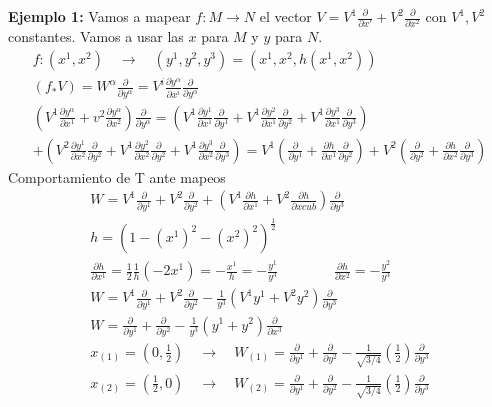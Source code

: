 \documentclass{article}
\begin{document}
\textbf{Ejemplo 1: } Vamos a mapear $ f: M \rightarrow N  $ el vector $ V = V^1  \frac{\partial  }{\partial x' } + V ^2 \frac{\partial  }{\partial x ^2} $ con $ V^1,V^2  $ constantes. Vamos a usar las $ x  $ para $ M  $ y $ y  $ para $  N  $.
\begin{gather*}
  f: ( x ^ {1 } , x ^ {2 }) \quad \rightarrow \quad (y ^ {1 }, y ^ {2 }, y ^ {3 }) = (x ^ {1 }, x ^ { 2 }, h(x ^ {1 }, x ^ {2 }))\\
  (f_* V ) = W ^ {\alpha } \frac{\partial  }{\partial y ^ {\alpha }} = V ^ {i } \frac{\partial y ^ {\alpha} }{\partial x ^ {i }}\frac{\partial  }{\partial y ^ {\alpha }}\\
  \left(V ^ {1 } \frac{\partial y ^ {\alpha } }{\partial x ^ {1 }} + v ^ {2 } \frac{\partial y ^ {\alpha } }{\partial x ^ {2 }}\right) \frac{\partial  }{\partial y ^ { \alpha }} = \left(V ^ {1 } \frac{\partial y ^ {1 }}{\partial x ^ {1 } }\frac{\partial  }{\partial y ^ {1 }} + V ^ { 1 } \frac{\partial y ^ {2 } }{\partial  x ^ {1 }} \frac{\partial  }{\partial y ^2} + V ^ {1 } \frac{\partial y ^ {3 } }{\partial x ^ {1 } }\frac{\partial  }{\partial y ^ {3 }}\right) \\
  + \left(V ^ {2 } \frac{\partial y ^ {1 }}{\partial x ^ {2 } }\frac{\partial  }{\partial y ^ {2 }} + V ^ { 1 } \frac{\partial y ^ {2 } }{\partial  x ^ {2 }} \frac{\partial  }{\partial y ^2} + V ^ {1 } \frac{\partial y ^ {3 } }{\partial x ^ {2 } }\frac{\partial  }{\partial y ^ {3 }}\right) = V ^ {1 } ( \frac{\partial  }{\partial y ^ {1 }} + \frac{\partial h  }{\partial x^1}\frac{\partial  }{\partial y ^2}) + V ^ {2 } ( \frac{\partial  }{\partial y ^ {2 }} + \frac{\partial h  }{\partial x^2}\frac{\partial  }{\partial y ^3}) 
\end{gather*}
Comportamiento de T ante mapeos 
\begin{gather*}
  W = V^1 \frac{\partial  }{\partial y ^ {1 }} + V^2 \frac{\partial  }{\partial y ^2 } + \left(V ^ {1 } \frac{\partial h  }{\partial x ^ {1 }} + V ^2 \frac{\partial h  }{\partial x cub}\right) \frac{\partial  }{\partial y ^ {3 }}\\
  h = (1 - (x ^1)^2 - (x ^2)^2)^ {\frac{1}{2}}\\
  \frac{\partial h  }{\partial x ^1 } = \frac{1}{2} \frac{1}{h}(-2x^1) = - \frac{x^1 }{h } = - \frac{y^1 }{y^3 } \qquad \qquad \frac{\partial h  }{\partial x ^2} = - \frac{y ^2}{y ^ {3 }}\\
  W = V^1 \frac{\partial  }{\partial y^1 } + V^2 \frac{\partial  }{\partial y ^2} - \frac{1}{y ^3 } \left(V^1 y^1 + V^2 y^2 \right)\frac{\partial  }{\partial y ^3 }\\
  W = \frac{\partial  }{\partial y ^1 } + \frac{\partial  }{\partial y ^2 } - \frac{1}{y^3 } (y^1 + y^2) \frac{\partial  }{\partial x^3 }\\
  x _{(1)}  = (0,\frac{1}{2}) \quad \rightarrow \quad W _{(1) } = \frac{\partial  }{\partial y ^ {1 }} + \frac{\partial  }{\partial y ^ {2 }} - \frac{1}{\sqrt{3/4 } }\left(\frac{1}{2}\right)\frac{\partial  }{\partial y ^ {3 }}\\
  x _{(2) } = (\frac{1}{2}, 0 ) \quad \rightarrow \quad W _{(2) } = \frac{\partial  }{\partial y ^ {1 }} + \frac{\partial  }{\partial y ^ {2 }} - \frac{1}{\sqrt{3/4 } }\left(\frac{1}{2}\right)\frac{\partial  }{\partial y ^3 }
\end{gather*}
\end{document}
